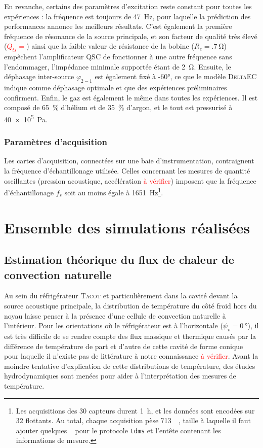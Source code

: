 En revanche, certains des paramètres d'excitation reste constant pour toutes les expériences : la fréquence est toujours de \qty{47}{\hertz}, pour laquelle la prédiction des performances annonce les meilleurs résultats. C'est également la première fréquence de résonance de la source principale, et son facteur de qualité très élevé (\textcolor{red}{$Q_{ts}=$}) ainsi que la faible valeur de résistance de la bobine ($R_e=\qty{.7}{\ohm}$) empêchent l'amplificateur QSC de fonctionner à une autre fréquence sans l'endommager, l'impédance minimale supportée étant de \qty{2}{\ohm}. Ensuite, le déphasage inter-source $\varphi_{2-1}$ est également fixé à \ang{-60}, ce que le modèle \textsc{DeltaEC} indique comme déphasage optimale et que des expériences préliminaires confirment. Enfin, le gaz est également le même dans toutes les expériences. Il est composé de \qty{65}{\percent} d'hélium et de \qty{35}{\percent} d'argon, et le tout est pressurisé à \qty{40e5}{\pascal}.



\subsubsection{Paramètres d'acquisition}

Les cartes d'acquisition, connectées sur une baie d'instrumentation, contraignent la fréquence d'échantillonage utilisée. Celles concernant les mesures de quantité oscillantes (pression acoustique, accélération \textcolor{red}{à vérifier}) imposent que la fréquence d'échantillonage $f_s$ soit au moins égale à \qty{1651}{\Hz}\footnote{Les acquisitions des \num{30} capteurs durent \qty{1}{\hour}, et les données sont encodées sur \qty{32}{\bit} flottants. Au total, chaque acquisition pèse \qty{713}{\mega\byte}, taille à laquelle il faut ajouter quelques \unit{\mega\byte} pour le protocole \texttt{tdms} et l'entête contenant les informations de mesure.}.

\section{Ensemble des simulations réalisées}
\subsection{Estimation théorique du flux de chaleur de convection naturelle}
Au sein du réfrigérateur \textsc{Tacot} et particulièrement dans la cavité devant la source acoustique principale, la distribution de température du côté froid hors du noyau laisse penser à la présence d'une cellule de convection naturelle à l'intérieur. Pour les orientations où le réfrigérateur est à l'horizontale ($\psi_v=\qty{0}{\degree}$), il est très difficile de se rendre compte des flux massique et thermique causés par la différence de température de part et d'autre de cette cavité de forme conique pour laquelle il n'existe pas de littérature à notre connaissance \textcolor{red}{à vérifier}. Avant la moindre tentative d'explication de cette distributions de température, des études hydrodynamiques sont menées pour aider à l'interprétation des mesures de température. 


